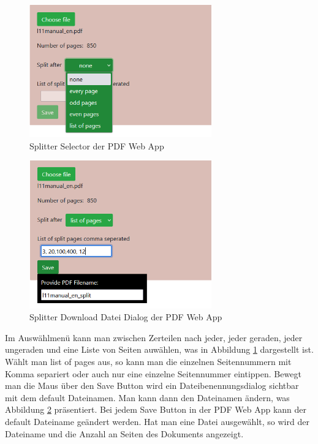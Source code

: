 \begin{figure}[!htbp]
	\centering
	\includegraphics[width=0.7\textwidth]{"images/splitter2.png"}
	\caption{Splitter Selector der PDF Web App}
	\label{fig:splitter2}
\end{figure}

\begin{figure}[!htbp]
	\centering
	\includegraphics[width=0.7\textwidth]{"images/splitter3.png"}
	\caption{Splitter Download Datei Dialog der PDF Web App}
	\label{fig:splitter3}
\end{figure}

Im Auswählmenü kann man zwischen Zerteilen nach jeder, jeder geraden, jeder ungeraden und eine Liste von Seiten auwählen, was in Abbildung \ref{fig:splitter2} dargestellt ist. Wählt man list of pages aus, so kann man die einzelnen Seitennummern mit Komma separiert oder auch nur eine einzelne Seitennummer eintippen. Bewegt man die Maus über den Save Button wird ein Dateibenennungsdialog sichtbar mit dem default Dateinamen. Man kann dann den Dateinamen ändern, was Abbildung \ref{fig:splitter3} präsentiert. Bei jedem Save Button in der PDF Web App kann der default Dateiname geändert werden. Hat man eine Datei ausgewählt, so wird der Dateiname und die Anzahl an Seiten des Dokuments angezeigt. \\


